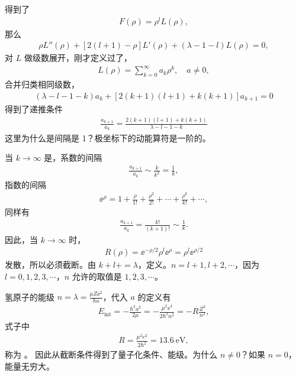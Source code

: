得到了
\begin{align}
    F(\rho) = \rho^l L(\rho),
\end{align}
那么
\begin{align}
    \rho L''(\rho) + [2(l+1) -\rho]L'(\rho) + (\lambda - 1 -l) L(\rho) = 0, \label{eq:hydro_L_initial_def}
\end{align}
对 $L$ 做级数展开，刚才定义过了，
\begin{align}
    L(\rho) = \sum_{k=0}^\infty a_k \rho^k, \quad a\neq 0,
\end{align}
合并归类相同级数，
\begin{align}
    (\lambda - l - 1 - k)a_k + 
    \left[
        2(k+1) (l+1) + k(k+1)
    \right] a_{k+1} = 0
\end{align}
得到了递推条件
\begin{align}
    \frac{a_{k+1}}{a_k} = \frac{2(k+1) (l+1) + k(k+1)} {\lambda - l - 1 - k}
\end{align}
这里为什么是间隔是 1？极坐标下的动能算符是一阶的。

当 $k\rightarrow\infty$ 是，系数的间隔
\begin{align}
    \frac{a_{k+1}}{a_k} \sim \frac{k}{k^2} = \frac1{k},
\end{align}
指数的间隔
\begin{align}
    \ee^\rho = 1 + \frac{\rho}{1!} + \frac{\rho^2}{2!} + \cdots + \frac{\rho^k}{k!} + \cdots,
\end{align}
同样有
\begin{align}
    \frac{a_{k+1}}{a_k} = \frac{k!}{(k+1)!} \sim \frac1{k}. 
\end{align}
因此，当 $k\rightarrow\infty$ 时，
\begin{align}
    R(\rho) = \ee^{-\rho/2} \rho^l \ee^{\rho} = \rho^l \ee^{\rho/2}
\end{align}
发散，所以必须截断。由 $k+l+ = \lambda$，定义。$n=l+1, l+2, \cdots$，因为 $l=0,1,2,3,\cdots$，$n$ 允许的取值是 $1,2,3,\cdots$。

氢原子的能级 $n = \lambda = \frac{\mu Z \ee^2}{\hbar a}$，代入 $a$ 的定义有
\begin{align}
    E_{\mathrm{int}} = -\frac{\hbar^2a^2}{2\mu} = - \frac{\mu^2 \ee^4} {2\hbar^2 n^2} = - R\frac{Z^2}{n^2},
\end{align}
式子中
\begin{align}
    R = \frac{\mu^2e^2}{2\hbar^2} = \SI{13.6}{\electronvolt},
\end{align}
称为 。
因此从截断条件得到了量子化条件、能级。为什么 $n\neq 0$？如果 $n=0$，能量无穷大。

